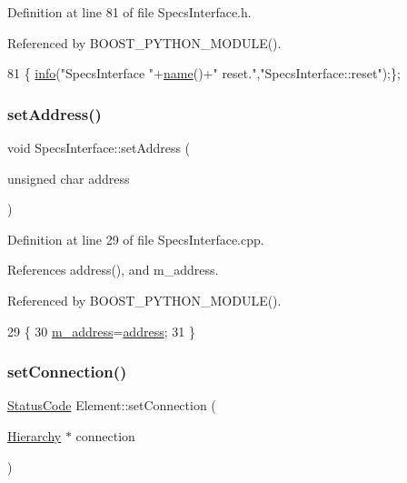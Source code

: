 Definition at line 81 of file Specs\+Interface.\+h.



Referenced by B\+O\+O\+S\+T\+\_\+\+P\+Y\+T\+H\+O\+N\+\_\+\+M\+O\+D\+U\+L\+E().


\begin{DoxyCode}
81 \{ \hyperlink{classObject_a644fd329ea4cb85f54fa6846484b84a8}{info}(\textcolor{stringliteral}{"SpecsInterface "}+\hyperlink{classObject_a300f4c05dd468c7bb8b3c968868443c1}{name}()+\textcolor{stringliteral}{" reset."},\textcolor{stringliteral}{"SpecsInterface::reset"});\};
\end{DoxyCode}
\mbox{\label{classSpecsInterface_aa92dff67cc80487ee3109b6aee2fa007}} 
\subsubsection{\texorpdfstring{set\+Address()}{setAddress()}}
{\footnotesize\ttfamily void Specs\+Interface\+::set\+Address (\begin{DoxyParamCaption}\item[{unsigned char}]{address }\end{DoxyParamCaption})}



Definition at line 29 of file Specs\+Interface.\+cpp.



References address(), and m\+\_\+address.



Referenced by B\+O\+O\+S\+T\+\_\+\+P\+Y\+T\+H\+O\+N\+\_\+\+M\+O\+D\+U\+L\+E().


\begin{DoxyCode}
29                                                     \{
30     \hyperlink{classSpecsInterface_a4064da5ca6e0a172363967c4acc0b365}{m\_address}=\hyperlink{classSpecsInterface_a0fa039a15b842a5ba783ce825b9915d8}{address};
31 \}
\end{DoxyCode}
\mbox{\label{classElement_ab476b4b1df5954141ceb14f072433b89}} 
\subsubsection{\texorpdfstring{set\+Connection()}{setConnection()}}
{\footnotesize\ttfamily \hyperlink{classStatusCode}{Status\+Code} Element\+::set\+Connection (\begin{DoxyParamCaption}\item[{\hyperlink{classHierarchy}{Hierarchy} $\ast$}]{connection }\end{DoxyParamCaption})\hspace{0.3cm}{\ttfamily [inherited]}}

